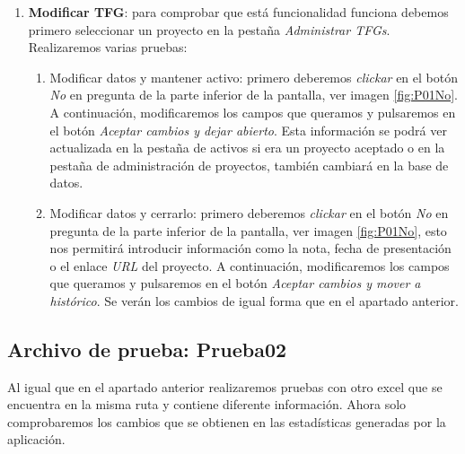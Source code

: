 \begin{enumerate}
	
	\item \textbf{Modificar TFG}: para comprobar que está funcionalidad funciona debemos primero seleccionar un proyecto en la pestaña \emph{Administrar TFGs}. Realizaremos varias pruebas:
		\begin{enumerate}
			\item Modificar datos y mantener activo: primero deberemos \emph{clickar} en el botón \emph{No} en pregunta de la parte inferior de la pantalla, ver imagen \ref{fig:P01No}. A continuación, modificaremos los campos que queramos y pulsaremos en el botón \emph{Aceptar cambios y dejar abierto}. Esta información se podrá ver actualizada en la pestaña de activos si era un proyecto aceptado o en la pestaña de administración de proyectos, también cambiará en la base de datos.
			\item Modificar datos y cerrarlo: primero deberemos \emph{clickar} en el botón \emph{No} en pregunta de la parte inferior de la pantalla, ver imagen \ref{fig:P01No}, esto nos permitirá introducir información como la nota, fecha de presentación o el enlace \emph{URL} del proyecto. A continuación, modificaremos los campos que queramos y pulsaremos en el botón \emph{Aceptar cambios y mover a histórico}. Se verán los cambios de igual forma que en el apartado anterior.			
		\end{enumerate}
\end{enumerate}


\subsection{Archivo de prueba: Prueba02}
Al igual que en el apartado anterior realizaremos pruebas con otro excel que se encuentra en la misma ruta y contiene diferente información. Ahora solo comprobaremos los cambios que se obtienen en las estadísticas generadas por la aplicación.

